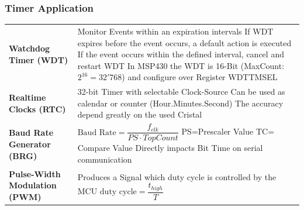 \subsubsection{Timer Application }
\begin{tabular}{p{6cm} p{15cm}}
	\textbf{Watchdog Timer (\acs{WDT})} &
    Monitor Events within an expiration intervals\newline
	 If \acs{WDT} expires before the event occurs, a default action is executed\newline
	 If the event occurs within the defined interval, cancel and restart WDT\newline
	 In MSP430 the \acs{WDT} is 16-Bit (MaxCount: $2^{16}=32'768$) \newline
	 and configure over Register WDTTMSEL\\
     
	\textbf{Realtime Clocks (\acs{RTC})} &
    32-bit Timer with selectable Clock-Source\newline
    Can be used as calendar or counter (Hour.Minutes.Second)\newline
    The accuracy depend greatly on the used Cristal\\
    
	\textbf{Baud Rate Generator (\acs{BRG})} &
     $ \text{Baud Rate}=\dfrac{f_{clk}}{PS \cdot TopCount} $\newline
     PS=Prescaler Value \quad TC= Compare Value\newline
     Directly impacts Bit Time on serial communication\\
     
	\textbf{Pulse-Width Modulation (\acs{PWM})} &
    Produces a Signal which duty cycle is controlled by the \acs{MCU} \newline
    $ \text{duty cycle}=\dfrac{t_{high}}{T} $\\
\end{tabular}

